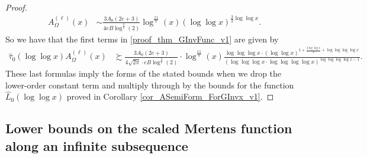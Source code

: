 \documentclass[11pt,reqno,a4letter]{article}
\numberwithin{figure}{section}
\numberwithin{table}{section}
\theoremstyle{plain}
\numberwithin{theorem}{section}
\theoremstyle{definition}
\begin{document}
\begin{proof}
\begin{align*}
A_{\Omega}^{(\ell)}(x) & \sim 
     \frac{3A_0(2e+3)}{4eB \log^{\frac{3}{2}}(2)} \log^{\frac{11}{7}}(x) (\log\log x)^{\frac{3}{2}\log\log x}. 
\end{align*} 
So we have that the first terms in \eqref{proof_thm_GInvFunc_v1} 
are given by 
\begin{align*} 
\widehat{\tau}_0(\log\log x) A_{\Omega}^{(\ell)}(x) & \succsim 
     \frac{3A_0(2e+3)}{4 \sqrt{2\pi} \cdot eB \log^{\frac{3}{2}}(2)} \cdot 
     \log^{\frac{11}{7}}(x) \frac{\log\log\log x \cdot 
     (\log\log x)^{1+\frac{3\log\log x}{2}+\log\log\log\log x}}{ 
     (\log\log\log x \cdot \log\log\log\log x)^{\log\log\log\log x-1}}. 
\end{align*} 
These last formulas imply the forms of the stated bounds when we drop the lower-order 
constant term and multiply through by the bounds for the function 
$\widehat{L}_0(\log\log x)$ 
proved in Corollary \ref{cor_ASemiForm_ForGInvx_v1}. 
\end{proof} 

\subsection{Lower bounds on the scaled Mertens function along an infinite subsequence}
\end{document}
